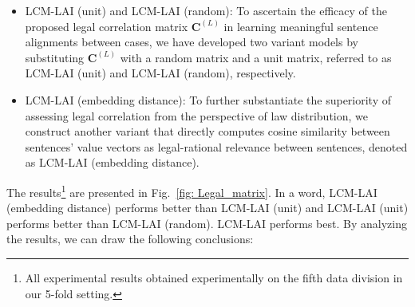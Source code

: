 \begin{itemize}
    \item {
    LCM-LAI (unit) and LCM-LAI (random): To ascertain the efficacy of the proposed legal correlation matrix $\mathbf{C}^{(L)}$ in learning meaningful sentence alignments between cases, we have developed two variant models by substituting $\mathbf{C}^{(L)}$ with a random matrix and a unit matrix, referred to as LCM-LAI (unit) and LCM-LAI (random), respectively.
    }
    \item {
    LCM-LAI (embedding distance): To further substantiate the superiority of assessing legal correlation from the perspective of law distribution, we construct another variant that directly computes cosine similarity between sentences' value vectors as legal-rational relevance between sentences, denoted as LCM-LAI (embedding distance).
    }
\end{itemize}
The results\footnote{All experimental results obtained experimentally on the fifth data division in our 5-fold setting.} are presented in Fig.~\ref{fig: Legal_matrix}. 
In a word, LCM-LAI (embedding distance) performs better than LCM-LAI (unit) and LCM-LAI (unit) performs better than LCM-LAI (random).
LCM-LAI performs best.
By analyzing the results, we can draw the following conclusions:

\begin{figure*}[t]
\centering
  \hspace{-8mm}
\caption{The performance of LCM-LAI w.r.t. different mode of legal correlation matrix on LCM task.
}
\label{fig: Legal_matrix}
\end{figure*}


